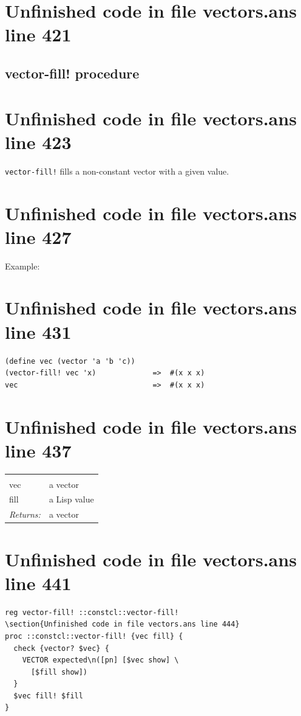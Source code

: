 \documentclass[twoside,9pt]{report}
\begin{document}
\section{Unfinished code in file vectors.ans line 421}
\subsection{vector-fill! procedure}
\label{vector-fill"!-procedure}
\section{Unfinished code in file vectors.ans line 423}


\texttt{vector-fill!} fills a non-constant vector with a given value.

\section{Unfinished code in file vectors.ans line 427}


Example:

\section{Unfinished code in file vectors.ans line 431}
\begin{verbatim}
(define vec (vector 'a 'b 'c))
(vector-fill! vec 'x)             =>  #(x x x)
vec                               =>  #(x x x)
\end{verbatim}
\section{Unfinished code in file vectors.ans line 437}
\noindent\begin{tabular}{ |p{1.9cm} p{8cm}| }
\hline
\rowcolor[HTML]{CCCCCC} \multicolumn{2}{|l|}{\bf vector-fill! (public)} \\
vec & a vector \\
fill & a Lisp value \\
\textit{Returns:} & a vector \\
\hline
\end{tabular}
\section{Unfinished code in file vectors.ans line 441}
\begin{lstlisting}
reg vector-fill! ::constcl::vector-fill!
\section{Unfinished code in file vectors.ans line 444}
proc ::constcl::vector-fill! {vec fill} {
  check {vector? $vec} {
    VECTOR expected\n([pn] [$vec show] \
      [$fill show])
  }
  $vec fill! $fill
}
\end{lstlisting}
\end{document}
